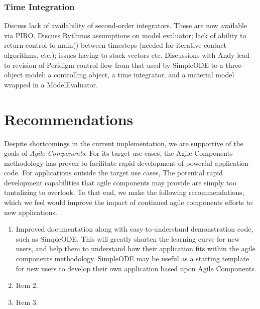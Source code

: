 \documentclass[10pt]{article}
\theoremstyle{plain}
\theoremstyle{definition}
\theoremstyle{remark}
\numberwithin{equation}{section}
\begin{document}
\subsubsection{Time Integration}
Discuss lack of availability of second-order integrators. These are now available via PIRO. Discuss Rythmos assumptions on model evaluator; lack of ability to return control to main() between timesteps (needed for iterative contact algorithms, etc.); issues having to stack vectors etc. Discussions with Andy lead to revision of Peridigm control flow from that used by SimpleODE to a three-object model: a controlling object, a time integrator, and a material model wrapped in a ModelEvaluator.

\section{Recommendations}
Despite shortcomings in the current implementation, we are supportive of the goals of \emph{Agile Components}. For its target use cases, the Agile Components methodology has proven to facilitate rapid development of powerful application code. For applications outside the target use cases, The potential rapid development capabilities that agile components may provide are simply too tantalizing to overlook. To that end, we make the following recommendations, which we feel would improve the impact of continued agile components efforts to new applications.

\begin{enumerate}
  \item Improved documentation along with easy-to-understand demonstration code, such as SimpleODE. This will greatly shorten the learning curve for new users, and help them to understand how their application fits within the agile components methodology. SimpleODE may be useful as a starting template for new users to develop their own application based upon Agile Components. 
  \item Item 2.
  \item Item 3.
\end{enumerate}

%
%
\end{document}
